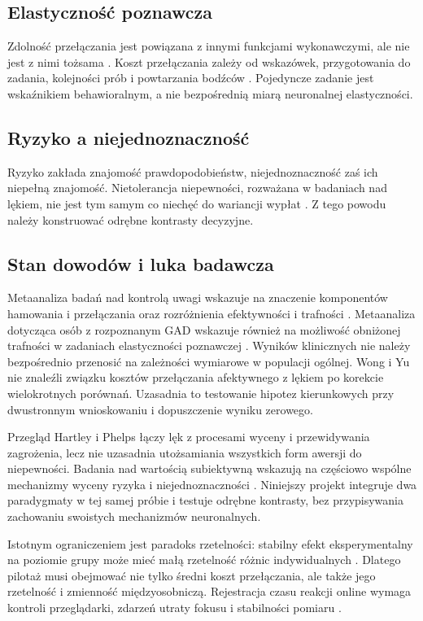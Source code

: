 \documentclass[11pt,a4paper]{article}
\begin{document}
\subsection{Elastyczność poznawcza}
Zdolność przełączania jest powiązana z innymi funkcjami wykonawczymi, ale nie jest z nimi tożsama \cite{Miyake2000}. Koszt przełączania zależy od wskazówek, przygotowania do zadania, kolejności prób i powtarzania bodźców \cite{Monsell2003}. Pojedyncze zadanie jest wskaźnikiem behawioralnym, a nie bezpośrednią miarą neuronalnej elastyczności.

\subsection{Ryzyko a niejednoznaczność}
Ryzyko zakłada znajomość prawdopodobieństw, niejednoznaczność zaś ich niepełną znajomość. Nietolerancja niepewności, rozważana w badaniach nad lękiem, nie jest tym samym co niechęć do wariancji wypłat \cite{Carleton2016}. Z tego powodu należy konstruować odrębne kontrasty decyzyjne.


\subsection{Stan dowodów i luka badawcza}
Metaanaliza badań nad kontrolą uwagi wskazuje na znaczenie komponentów hamowania i przełączania oraz rozróżnienia efektywności i trafności \cite{Shi2019}. Metaanaliza dotycząca osób z rozpoznanym GAD wskazuje również na możliwość obniżonej trafności w zadaniach elastyczności poznawczej \cite{GAD2025}. Wyników klinicznych nie należy bezpośrednio przenosić na zależności wymiarowe w populacji ogólnej. Wong i Yu \cite{Wong2026} nie znaleźli związku kosztów przełączania afektywnego z lękiem po korekcie wielokrotnych porównań. Uzasadnia to testowanie hipotez kierunkowych przy dwustronnym wnioskowaniu i dopuszczenie wyniku zerowego.

Przegląd Hartley i Phelps \cite{Hartley2012} łączy lęk z procesami wyceny i przewidywania zagrożenia, lecz nie uzasadnia utożsamiania wszystkich form awersji do niepewności. Badania nad wartością subiektywną wskazują na częściowo wspólne mechanizmy wyceny ryzyka i niejednoznaczności \cite{Levy2010}. Niniejszy projekt integruje dwa paradygmaty w tej samej próbie i testuje odrębne kontrasty, bez przypisywania zachowaniu swoistych mechanizmów neuronalnych.

Istotnym ograniczeniem jest paradoks rzetelności: stabilny efekt eksperymentalny na poziomie grupy może mieć małą rzetelność różnic indywidualnych \cite{Hedge2018}. Dlatego pilotaż musi obejmować nie tylko średni koszt przełączania, ale także jego rzetelność i zmienność międzyosobniczą. Rejestracja czasu reakcji online wymaga kontroli przeglądarki, zdarzeń utraty fokusu i stabilności pomiaru \cite{Bridges2020}.
\end{document}
